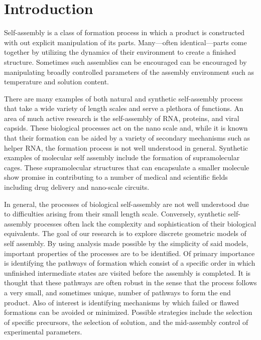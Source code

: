 
\section{Introduction}

Self-assembly is a class of formation process in which a product is constructed with out explicit manipulation of its parts. Many---often identical---parts come together by utilizing the dynamics of their environment to create a finished structure. Sometimes such assemblies can be encouraged can be encouraged by manipulating broadly controlled parameters of the assembly environment such as temperature and solution content. 

There are many examples of both natural and synthetic self-assembly process that take a wide variety of length scales and serve a plethora of functions. An area of much active research is the self-assembly of RNA, proteins, and viral capsids. These biological processes act on the nano scale and, while it is known that their formation can be aided by a variety of secondary mechanisms such as helper RNA, the formation process is not well understood in general. Synthetic examples of molecular self assembly include the formation of supramolecular cages. These supramolecular structures that can encapsulate a smaller molecule show promise in contributing to a number of medical and scientific fields including drug delivery and nano-scale circuits. 

In general, the processes of biological self-assembly are not well understood due to difficulties arising from their small length scale. Conversely, synthetic self-assembly processes often lack the complexity and sophistication of their biological equivalents. The goal of our research is to explore discrete geometric models of self assembly. By using analysis made possible by the simplicity of said models, important properties of the processes are to be identified. Of primary importance is identifying the pathways of formation which consist of a specific order in which unfinished intermediate states are visited before the assembly is completed. It is thought that these pathways are often robust in the sense that the process follows a very small, and sometimes unique, number of pathways to form the end product. Also of interest is identifying mechanisms by which failed or flawed formations can be avoided or minimized. Possible strategies include the selection of specific precursors, the selection of solution, and the mid-assembly control of experimental parameters. 

